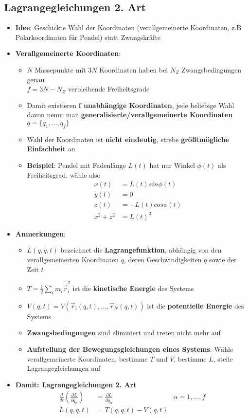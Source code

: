 \newpage
\subsection{Lagrangegleichungen 2. Art}%
\label{lag:sub:lagrangegleichungen_2_art}

\begin{itemize}
	\item \textbf{Idee}: Geschickte Wahl der Koordinaten (verallgemeinerte Koordinaten, z.B Polarkoordinaten für Pendel) statt Zwangskräfte
	\item \textbf{Verallgemeinerte Koordinaten}:
	\begin{itemize}
		\item $N$ Massepunkte mit $3N$ Koordinaten haben bei $N_Z$ Zwangsbedingungen genau\\$f = 3N - N_Z$ verbleibende Freiheitsgrade
		\item Damit existieren \textbf{f unabhängige Koordinaten}, jede beliebige Wahl davon nennt man \textbf{generalisierte/verallgemeinerte Koordinaten} $q = \{q_1, \dots, q_f\}$
		\item Wahl der Koordinaten ist \textbf{nicht eindeutig}, strebe \textbf{größtmögliche Einfachheit} an
		\item \textbf{Beispiel}: Pendel mit Fadenlänge $L(t)$ hat nur Winkel $\phi(t)$ als Freiheitsgrad, wähle also
		\begin{align*}
			x(t) &= L(t)sin\phi(t)\\
			y(t) &= 0\\
			z(t) &= -L(t)cos\phi(t)\\
			x^2 + z^2 &= L(t)^2
		\end{align*}
	\end{itemize}
	\item \textbf{Anmerkungen}:
	\begin{itemize}
		\item $L(q, \dot{q}, t)$ bezeichnet die \textbf{Lagrangefunktion}, abhängig von den verallgemeinerten Koordinaten $q$, deren Geschwindigkeiten $\dot{q}$ sowie der Zeit $t$
		\item $T = \frac{1}{2}\sum_im_i\dot{\vec{r}}_i^2$ ist die \textbf{kinetische Energie} des Systems
		\item $V(q, t) = V(\vec{r}_i(q, t), \dots, \vec{r}_N(q, t))$ ist die \textbf{potentielle Energie} des Systems
		\item \textbf{Zwangsbedingungen} sind eliminiert und treten nicht mehr auf
		\item \textbf{Aufstellung der Bewegungsgleichungen eines Systems}: Wähle verallgemeinerte Koordinaten, bestimme $T$ und $V$, bestimme $L$, stelle Lagrangegleichungen auf
	\end{itemize}
	\item \textbf{Damit: Lagrangegleichungen 2. Art}
	\begin{align*}
		\frac{d}{dt}(\frac{\partial L}{\partial \dot{q}_\alpha}) &= \frac{\partial L}{\partial q_\alpha} &\alpha = 1, \dots, f\\
		L(q, \dot{q}, t) &= T(q, \dot{q}, t) - V(q, t) &
	\end{align*}
\end{itemize}

